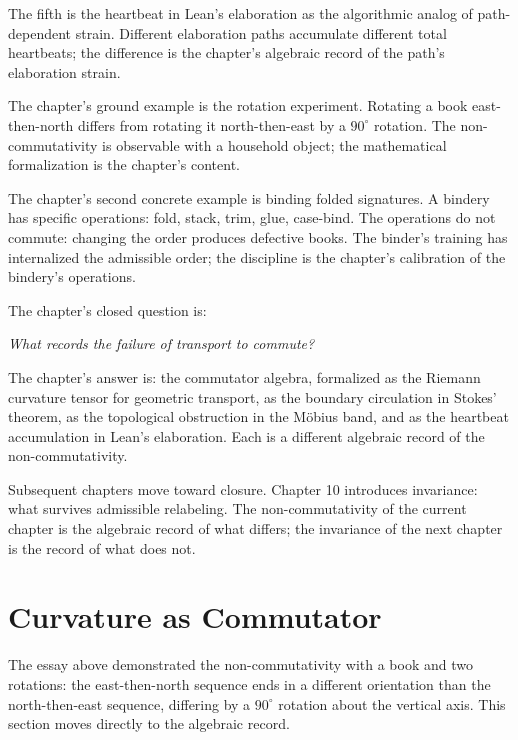\begin{chapteressay}
The fifth is the heartbeat in Lean's elaboration as the
algorithmic analog of path-dependent strain. Different
elaboration paths accumulate different total heartbeats; the
difference is the chapter's algebraic record of the path's
elaboration strain.

The chapter's ground example is the rotation experiment. Rotating
a book east-then-north differs from rotating it north-then-east
by a $90^\circ$ rotation. The non-commutativity is observable
with a household object; the mathematical formalization is the
chapter's content.

The chapter's second concrete example is binding folded
signatures. A bindery has specific operations: fold, stack,
trim, glue, case-bind. The operations do not commute: changing
the order produces defective books. The binder's training has
internalized the admissible order; the discipline is the
chapter's calibration of the bindery's operations.

The chapter's closed question is:

\begin{center}
\emph{What records the failure of transport to commute?}
\end{center}

The chapter's answer is: the commutator algebra, formalized as
the Riemann curvature tensor for geometric transport, as the
boundary circulation in Stokes' theorem, as the topological
obstruction in the M\"obius band, and as the heartbeat
accumulation in Lean's elaboration. Each is a different
algebraic record of the non-commutativity.

Subsequent chapters move toward closure. Chapter 10 introduces
invariance: what survives admissible relabeling. The
non-commutativity of the current chapter is the algebraic
record of what differs; the invariance of the next chapter is
the record of what does not.

\end{chapteressay}

\section{Curvature as Commutator}
\label{se:curvature-as-commutator}

The essay above demonstrated the non-commutativity with a book and
two rotations: the east-then-north sequence ends in a different
orientation than the north-then-east sequence, differing by a
$90^\circ$ rotation about the vertical axis. This section moves
directly to the algebraic record.

